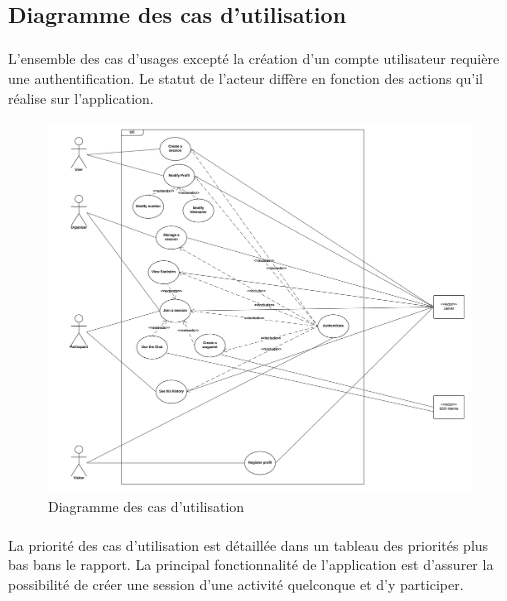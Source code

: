 \documentclass[titlepage, 12pt]{report}
\begin{document}
\subsection{Diagramme des cas d'utilisation}

\paragraph{}L'ensemble des cas d'usages excepté la création d'un compte utilisateur requière une authentification. Le statut de l'acteur diffère en fonction des actions qu'il réalise sur l'application. 

\begin{figure}[!h]
	\caption{Diagramme des cas d'utilisation}
	\label{use_case_diagram}
	\centering
	\includegraphics[scale=0.5]{Images/diagram/use_case_diagram.png}
\end{figure}

\clearpage

\paragraph{}La priorité des cas d'utilisation est détaillée dans un tableau des priorités plus bas bans le rapport. La principal fonctionnalité de l'application est d'assurer la possibilité de créer une session d'une activité quelconque et d'y participer.
\end{document}
